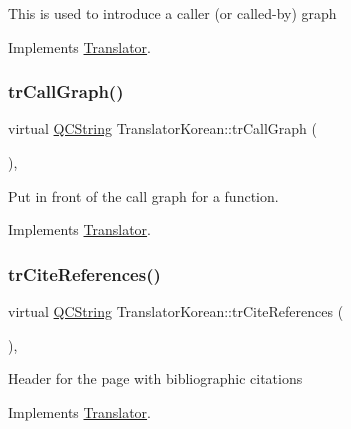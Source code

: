 This is used to introduce a caller (or called-\/by) graph 

Implements \mbox{\hyperlink{class_translator}{Translator}}.

\mbox{\label{class_translator_korean_a0c9c9d921a209328cc20f944447d3f63}} 
\subsubsection{\texorpdfstring{trCallGraph()}{trCallGraph()}}
{\footnotesize\ttfamily virtual \mbox{\hyperlink{class_q_c_string}{Q\+C\+String}} Translator\+Korean\+::tr\+Call\+Graph (\begin{DoxyParamCaption}{ }\end{DoxyParamCaption})\hspace{0.3cm}{\ttfamily [inline]}, {\ttfamily [virtual]}}

Put in front of the call graph for a function. 

Implements \mbox{\hyperlink{class_translator}{Translator}}.

\mbox{\label{class_translator_korean_a55998cd0285a3d19fadeacc40825fbb5}} 
\subsubsection{\texorpdfstring{trCiteReferences()}{trCiteReferences()}}
{\footnotesize\ttfamily virtual \mbox{\hyperlink{class_q_c_string}{Q\+C\+String}} Translator\+Korean\+::tr\+Cite\+References (\begin{DoxyParamCaption}{ }\end{DoxyParamCaption})\hspace{0.3cm}{\ttfamily [inline]}, {\ttfamily [virtual]}}

Header for the page with bibliographic citations 

Implements \mbox{\hyperlink{class_translator}{Translator}}.

\mbox{\label{class_translator_korean_a47f5df8924d85212293da8f90b15c38f}} 
